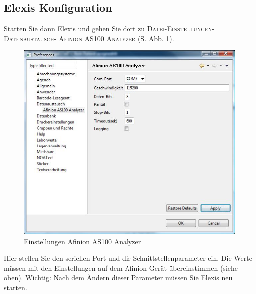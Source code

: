 \documentclass[a4paper]{scrartcl}
\begin{document}
\subsection{Elexis Konfiguration}
Starten Sie dann Elexis und gehen Sie dort zu \textsc{Datei-Einstellungen-Datenaustausch- Afinion AS100 Analyzer} (S. Abb. \ref{fig:config}).
\begin{figure}[h]
    \includegraphics{config}
    \caption{Einstellungen Afinion AS100 Analyzer}
    \label{fig:config}
\end{figure}
Hier stellen Sie den seriellen Port und die Schnittstellenparameter ein. Die Werte m\"ussen mit den Einstellungen auf dem Afinion Ger\"at \"ubereinstimmen (siehe oben). Wichtig: Nach dem \"Andern dieser Parameter m\"ussen Sie Elexis neu starten.
\end{document}
